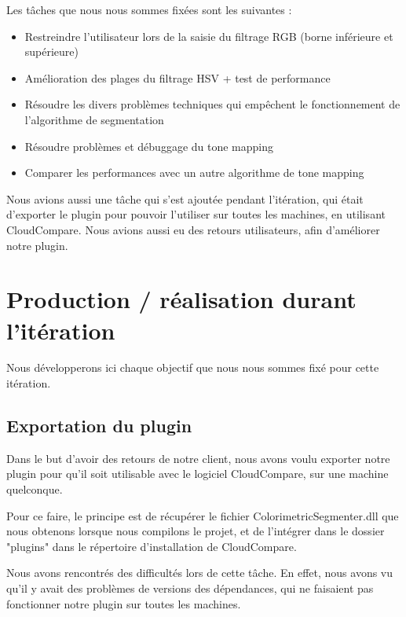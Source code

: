 \documentclass[12pt,titlepage,french]{article}
\begin{document}
Les tâches que nous nous sommes fixées sont les suivantes :

\begin{itemize}
    \item Restreindre l'utilisateur lors de la saisie du filtrage RGB (borne inférieure et supérieure)
    \item Amélioration des plages du filtrage HSV + test de performance
    \item Résoudre les divers problèmes techniques qui empêchent le fonctionnement de l'algorithme de segmentation
    \item Résoudre problèmes et débuggage du tone mapping
    \item Comparer les performances avec un autre algorithme de tone mapping
\end{itemize}

Nous avions aussi une tâche qui s'est ajoutée pendant l'itération, qui était d'exporter le plugin pour pouvoir l'utiliser sur toutes les machines, en utilisant CloudCompare. Nous avions aussi eu des retours utilisateurs, afin d'améliorer notre plugin.

\section{Production / réalisation durant l'itération}

Nous développerons ici chaque objectif que nous nous sommes fixé pour cette itération.


\subsection{Exportation du plugin}

Dans le but d'avoir des retours de notre client, nous avons voulu exporter notre plugin pour qu'il soit utilisable avec le logiciel CloudCompare, sur une machine quelconque. \newline

Pour ce faire, le principe est de récupérer le fichier ColorimetricSegmenter.dll que nous obtenons lorsque nous compilons le projet, et de l'intégrer dans le dossier "plugins" dans le répertoire d'installation de CloudCompare. \newline

Nous avons rencontrés des difficultés lors de cette tâche. En effet, nous avons vu qu'il y avait des problèmes de versions des dépendances, qui ne faisaient pas fonctionner notre plugin sur toutes les machines. \newline
\end{document}
